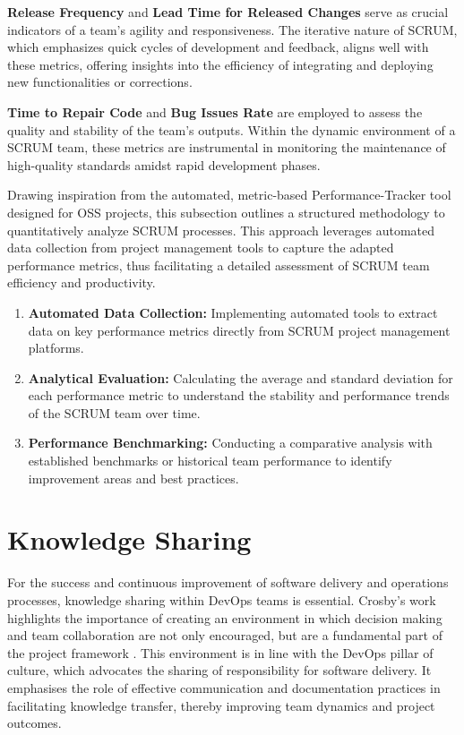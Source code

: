 \textbf{Release Frequency} and \textbf{Lead Time for Released Changes} serve as crucial indicators of a team's agility and responsiveness. The iterative nature of SCRUM, which emphasizes quick cycles of development and feedback, aligns well with these metrics, offering insights into the efficiency of integrating and deploying new functionalities or corrections.\cite{PerformanceEvalOSS2023}

\textbf{Time to Repair Code} and \textbf{Bug Issues Rate} are employed to assess the quality and stability of the team's outputs. Within the dynamic environment of a SCRUM team, these metrics are instrumental in monitoring the maintenance of high-quality standards amidst rapid development phases.\cite{PerformanceEvalOSS2023}

Drawing inspiration from the automated, metric-based Performance-Tracker tool designed for OSS projects, this subsection outlines a structured methodology to quantitatively analyze SCRUM processes. This approach leverages automated data collection from project management tools to capture the adapted performance metrics, thus facilitating a detailed assessment of SCRUM team efficiency and productivity.\cite{PerformanceEvalOSS2023}

\begin{enumerate}
    \item \textbf{Automated Data Collection:} Implementing automated tools to extract data on key performance metrics directly from SCRUM project management platforms.
    \item \textbf{Analytical Evaluation:} Calculating the average and standard deviation for each performance metric to understand the stability and performance trends of the SCRUM team over time.
    \item \textbf{Performance Benchmarking:} Conducting a comparative analysis with established benchmarks or historical team performance to identify improvement areas and best practices.
\end{enumerate}


\section{Knowledge Sharing}

For the success and continuous improvement of software delivery and operations processes, knowledge sharing within DevOps teams is essential. Crosby's work highlights the importance of creating an environment in which decision making and team collaboration are not only encouraged, but are a fundamental part of the project framework \cite{Crosby2023}. This environment is in line with the DevOps pillar of culture, which advocates the sharing of responsibility for software delivery. It emphasises the role of effective communication and documentation practices in facilitating knowledge transfer, thereby improving team dynamics and project outcomes.

